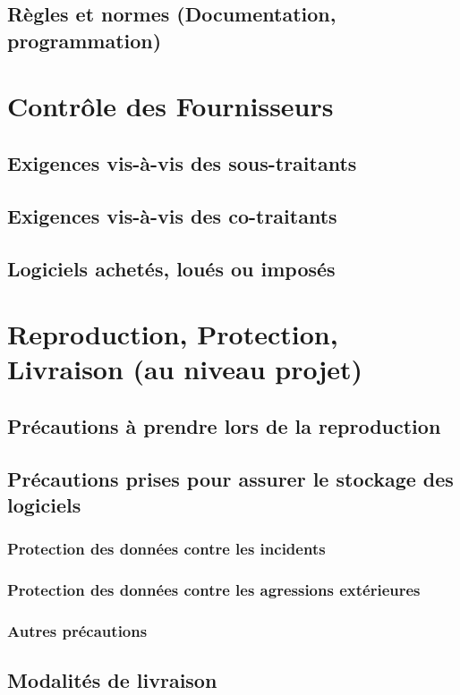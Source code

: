 \subsection{Règles et normes   (Documentation, programmation)}		

\section{Contrôle des Fournisseurs}
\subsection{Exigences vis-à-vis des sous-traitants}
\subsection{Exigences vis-à-vis des co-traitants}
\subsection{Logiciels achetés, loués ou imposés}

\section{Reproduction, Protection, Livraison (au niveau projet)}
\subsection{Précautions à prendre lors de la reproduction}
\subsection{Précautions prises pour assurer le stockage des logiciels}
\subsubsection{Protection des données contre les incidents}
\subsubsection{Protection des données contre les agressions extérieures}
\subsubsection{Autres précautions}
\subsection{Modalités de livraison}
